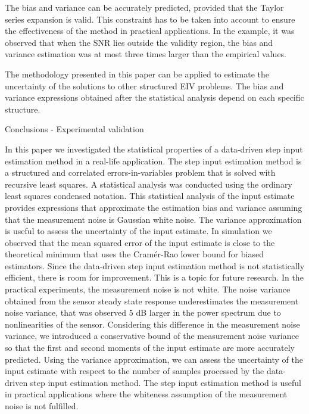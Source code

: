 The bias and variance can be accurately predicted, provided that the Taylor series expansion is valid.
This constraint has to be taken into account to ensure the effectiveness of the method in practical applications.
In the example, it was observed that when the SNR lies outside the validity region, the bias and variance estimation was at most three times larger than the empirical values.

The methodology presented in this paper can be applied to estimate the uncertainty of the solutions to other structured EIV problems.
The bias and variance expressions obtained after the statistical analysis depend on each specific structure.


Conclusions - Experimental validation

In this paper we investigated the statistical properties of a data-driven step input estimation method in a real-life application.
The step input estimation method is a structured and correlated errors-in-variables problem that is solved with recursive least squares.
A statistical analysis was conducted using the ordinary least squares condensed notation. 
This statistical analysis of the input estimate provides expressions that approximate the estimation bias and variance assuming that the measurement noise is Gaussian white noise. 
The variance approximation is useful to assess the uncertainty of the input estimate.
In simulation we observed that the mean squared error of the input estimate is close to the theoretical minimum that uses the Cram\'er-Rao lower bound for biased estimators.
Since the data-driven step input estimation method is not statistically efficient, there is room for improvement. This is a topic for future research.
In the practical experiments, the measurement noise is not white.
The noise variance obtained from the sensor steady state response underestimates the measurement noise variance, that was observed 5 dB larger in the power spectrum due to nonlinearities of the sensor.
Considering this difference in the measurement noise variance, we introduced a conservative bound of the measurement noise variance so that the first and second moments of the input estimate are more accurately predicted.
Using the variance approximation, we can assess the uncertainty of the input estimate with respect to the number of samples processed by the data-driven step input estimation method.
The step input estimation method is useful in practical applications where the whiteness assumption of the measurement noise is not fulfilled. 


